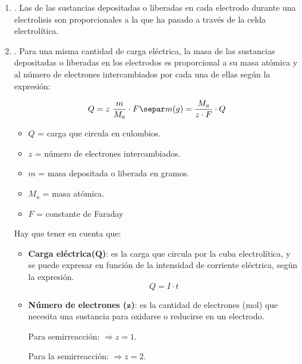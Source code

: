     \begin{enumerate}[label=\numberballmDarkTeal]
        \item {}.
        Las  de las sustancias depositadas o liberadas en cada electrodo durante una electrolisis son proporcionales a la  que ha pasado a través de la celda electrolítica.
        \item {}.
        Para una misma cantidad de carga eléctrica, la masa de las sustancias depositadas o liberadas en los electrodos es proporcional a su masa atómica y al número de electrones intercambiados por cada una de ellas según la expresión:

        \begin{gather}
            Q = z\ \dfrac{m}{M_a}\cdot F  \notag \separ
            m(g) = \dfrac{M_a}{z\cdot F}\cdot Q
        \end{gather}

        \begin{itemize}
            \item \(Q\) = carga que circula en culombios.
            \item \(z\) = número de electrones intercambiados.
            \item \(m\) = masa depositada o liberada en gramos.
            \item \(M_a\) = masa atómica.
            \item \(F\) = constante de Faraday
        \end{itemize}

        Hay que tener en cuenta que:

        \begin{itemize}
            \item \textbf{Carga eléctrica(\(\bm{Q}\))}: es la carga que circula por la cuba electrolítica, y se puede expresar en función de la intensidad de corriente eléctrica, según la expresión.
            \begin{equation*}
                Q = I\cdot t
            \end{equation*}
            \item \textbf{Número de electrones (\(\bm{z}\))}: es la cantidad de electrones (mol) que necesita una sustancia para oxidarse o reducirse en un electrodo.

            Para semirreacción:  \(\Rightarrow z = 1\).

            Para la semirreacción:  \(\Rightarrow z = 2\).
        \end{itemize}

    \end{enumerate}


